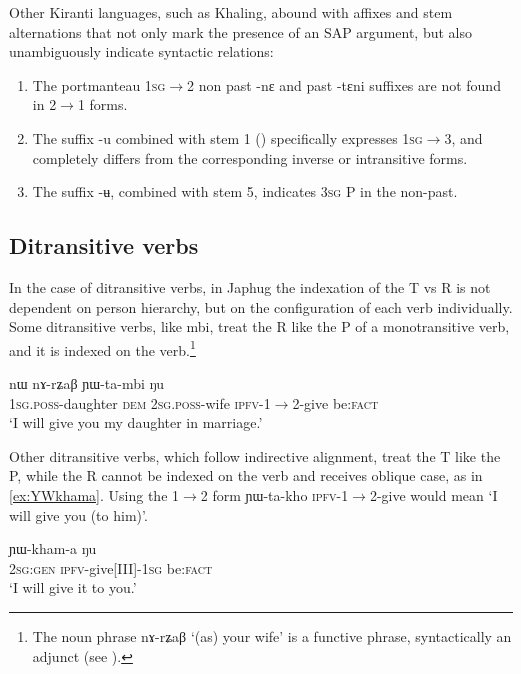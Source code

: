 \documentclass[oldfontcommands,oneside,a4paper,11pt]{article}
\newcommand{\ipa}[1]{{\phon \mbox{#1}}} %
\begin{document}
Other Kiranti languages, such as Khaling, abound with affixes and stem alternations that not only mark the presence of an SAP argument, but also unambiguously indicate syntactic relations:

\begin{enumerate}
\item The portmanteau \textsc{1sg$\rightarrow$2} non past \ipa{-nɛ} and past \ipa{-tɛni} suffixes are not found in 2$\rightarrow$1 forms.
\item The suffix \ipa{-u}  combined with stem 1 (\citealt[1104]{jacques12khaling}) specifically expresses \textsc{1sg$\rightarrow$3}, and completely differs from the corresponding inverse or intransitive forms.
\item The suffix \ipa{-ʉ}, combined with stem 5, indicates \textsc{3sg} P in the non-past.
\end{enumerate}


\subsection{Ditransitive verbs}
In the case of ditransitive verbs, in Japhug the indexation of the T vs R is not dependent on person hierarchy, but on the configuration of each verb individually. Some ditransitive verbs, like \ipa{mbi}, treat the R like the P of a monotransitive verb, and it is indexed on the verb.\footnote{The noun phrase \ipa{nɤ-rʑaβ} `(as) your wife' is a functive phrase, syntactically an adjunct (see \citealt{creissels14functive}).}

\begin{exe}
\ex \label{ex:YWtambi}
\gll \ipa{a-me} 	\ipa{nɯ} 	\ipa{nɤ-rʑaβ} 	\ipa{ɲɯ-ta-mbi} 	\ipa{ŋu} \\
\textsc{1sg.poss}-daughter \textsc{dem} \textsc{2sg.poss}-wife \textsc{ipfv}-1$\rightarrow$2-give be:\textsc{fact} \\
\glt `I will give you my daughter in marriage.'
\end{exe}

Other ditransitive verbs, which follow indirective alignment, treat the T like the P, while the R cannot be indexed on the verb and receives oblique case, as in \ref{ex:YWkhama}. Using the 1$\rightarrow$2 form \ipa{ɲɯ-ta-kho} \textsc{ipfv}-1$\rightarrow$2-give would mean `I will give you (to him)'.

\begin{exe}
\ex \label{ex:YWkhama}
\gll \ipa{nɤʑɯɣ} 	\ipa{ɲɯ-kham-a} \ipa{ŋu} \\
\textsc{2sg:gen} \textsc{ipfv}-give[III]-\textsc{1sg} be:\textsc{fact} \\
\glt `I will give it to you.'
\end{exe}
\end{document}
